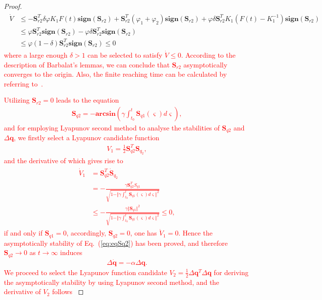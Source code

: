 \documentclass[3p]{elsarticle}
\theoremstyle{plain}
\theoremstyle{remark}
\begin{document}
\begin{proof}
{\begin{align}
\begin{split}
\dot V&\le -\bm S_{r2}^T\delta\varphi  K_1F(t)\bm{sign}(\bm S_{r2})+\bm S_{r2}^T(\varphi_1+\varphi_2) \bm{sign}(\bm S_{r2})+\varphi\delta \bm S_{r2}^T K_1(F(t)-K_1^{-1})\bm{sign}(\bm S_{r2})\\
&\le \varphi \bm S_{r2}^T\bm{sign}(\bm S_{r2})-\varphi\delta \bm S_{r2}^T \bm{sign}(\bm S_{r2})\\
&\le\varphi(1-\delta)\bm S_{r2}^T\bm{sign}(\bm S_{r2})\le 0
\end{split}
\end{align}}
\textcolor{red}{
where a large enough $\delta>1$ can be selected to satisfy $\dot V \le 0$. According to the description of Barbalat's lemmas, we can conclude  that $\bm S_{r2}$ asymptotically converges to the origin. Also, the finite reaching time can be calculated by referring to~\cite{Ma201667}.}\par
\textcolor{red}{Utilizing $\bm S_{r2}=0$ leads to the equation
\begin{align}
\bm S_{q2}=-\bm{arcsin}(\gamma\int^t_{t_0}\bm S_{q1}(\varsigma) d\varsigma),\label{eq:eqSq2}
\end{align}
and for employing Lyapunov second method to analyse the stabilities of $\bm S_{q2}$ and $\Delta\bm q$, we firstly select a Lyapunov candidate function
\begin{align}
V_1 = \frac{1}{2}\bm S_{q2}^T\bm S_{q_2},
\end{align}
and the derivative of which gives rise to
\begin{align}
\begin{split}
\dot V_1 &= \bm S_{q2}^T\dot {\bm S}_{q_2}\\
&=-\frac{\gamma \bm S_{q2}^TS_{q1}}{\sqrt{1-\Vert\gamma\int^t_{t_0}\bm S_{q1}(\varsigma) d\varsigma\Vert^2}}\\
&\le -\frac{\gamma \Vert \bm S_{q1}\Vert^2}{\sqrt{1-\Vert\gamma\int^t_{t_0}\bm S_{q1}(\varsigma) d\varsigma\Vert^2}}\le 0,
\end{split}
\end{align}
if and only if $\bm S_{q1} = 0$, accordingly, $\bm S_{q2} = 0$, one has $\dot V_1=0$. Hence the asymptotically stability of Eq.~(\ref{eq:eqSq2}) has been proved, and therefore $\bm S_{q2}\rightarrow 0$ as $t\rightarrow \infty$ induces
\begin{align}
\Delta \dot {\bm q}=-\alpha \Delta \bm q.
\end{align}
We proceed to select the Lyapunov function candidate $V_2=\frac{1}{2}\Delta \bm q^T\Delta\bm q$ for deriving the asymptotically stability by using Lyapunov second method, and the derivative of $V_2$ follows
}
\end{proof}
\end{document}
